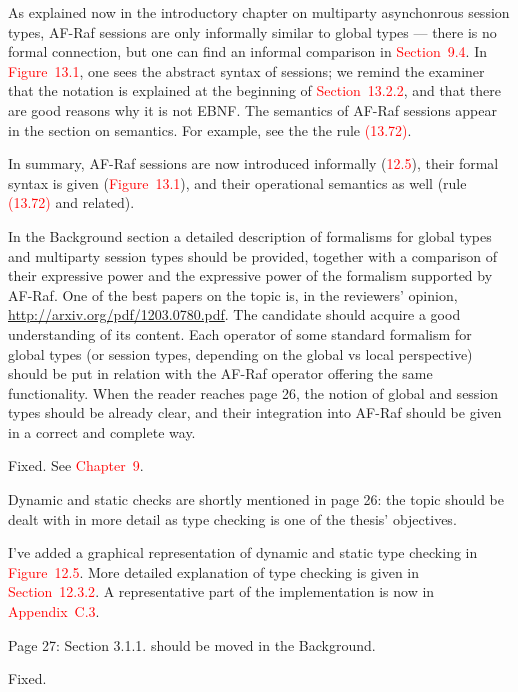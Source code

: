 \documentclass{article}
\newcommand*\R[1]{\textcolor{red}{#1}} %
\newenvironment{them}{\noindent\begingroup\color{blue}}{\endgroup\par}
\begin{document}
As explained now in the introductory chapter on multiparty asynchonrous session
types, AF-Raf sessions are only informally similar to global types --- there is
no formal connection, but one can find an informal comparison in
\R{Section~9.4}. In \R{Figure~13.1}, one sees the abstract syntax of sessions;
we remind the examiner that the notation is explained at the beginning of
\R{Section~13.2.2}, and that there are good reasons why it is not EBNF.  The
semantics of AF-Raf sessions appear in the section on semantics.  For example,
see the the rule \R{(13.72)}.

In summary,
  AF-Raf sessions are now introduced informally (\R{12.5}),
  their formal syntax is given (\R{Figure~13.1}),
  and their operational semantics as well (rule \R{(13.72)} and related).


\begin{them}

In the Background section a detailed description of formalisms for global types
and multiparty session types should be provided, together with a comparison of
their expressive power and the expressive power of the formalism supported by
AF-Raf. One of the best papers on the topic is, in the reviewers' opinion,
\url{http://arxiv.org/pdf/1203.0780.pdf}. The candidate should acquire a good
understanding of its content. Each operator of some standard formalism for
global types (or session types, depending on the global vs local perspective)
should be put in relation with the AF-Raf operator offering the same
functionality. When the reader reaches page 26, the notion of global and
session types should be already clear, and their integration into AF-Raf should
be given in a correct and complete way.

\end{them}
Fixed. See \R{Chapter~9}.

\begin{them}

Dynamic and static checks are shortly mentioned in page 26: the topic should be
dealt with in more detail as type checking is one of the thesis' objectives.

\end{them}
I've added a graphical representation of dynamic and static type checking
in \R{Figure~12.5}. More detailed explanation of type checking is given
in \R{Section~12.3.2}. A representative part of the implementation is now
in \R{Appendix~C.3}.

\begin{them}

Page 27:
Section 3.1.1. should be moved in the Background.
\end{them}
Fixed. 
\end{document}
